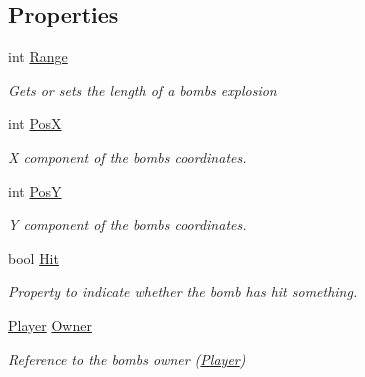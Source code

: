 \subsection*{Properties}
\begin{DoxyCompactItemize}
\item 
int \mbox{\hyperlink{class_bomberman_1_1_model_1_1_bomb_afc808bfdf103aa6910375d19c00589c9}{Range}}
\begin{DoxyCompactList}\small\item\em Gets or sets the length of a bomb\textquotesingle{}s explosion \end{DoxyCompactList}\item 
int \mbox{\hyperlink{class_bomberman_1_1_model_1_1_bomb_a66f8cc2285c09bca8c19df5f8a3d1f0b}{PosX}}
\begin{DoxyCompactList}\small\item\em X component of the bomb\textquotesingle{}s coordinates. \end{DoxyCompactList}\item 
int \mbox{\hyperlink{class_bomberman_1_1_model_1_1_bomb_a8dc94176d28e54462950607da08a03a4}{PosY}}
\begin{DoxyCompactList}\small\item\em Y component of the bomb\textquotesingle{}s coordinates. \end{DoxyCompactList}\item 
bool \mbox{\hyperlink{class_bomberman_1_1_model_1_1_bomb_aeaf547a4bffd2f4a393a5cd670145b88}{Hit}}
\begin{DoxyCompactList}\small\item\em Property to indicate whether the bomb has hit something. \end{DoxyCompactList}\item 
\mbox{\hyperlink{class_bomberman_1_1_model_1_1_player}{Player}} \mbox{\hyperlink{class_bomberman_1_1_model_1_1_bomb_a910b1defa28ef1de0a2794f90a00ba38}{Owner}}
\begin{DoxyCompactList}\small\item\em Reference to the bomb\textquotesingle{}s owner (\mbox{\hyperlink{class_bomberman_1_1_model_1_1_player}{Player}}) \end{DoxyCompactList}\end{DoxyCompactItemize}


